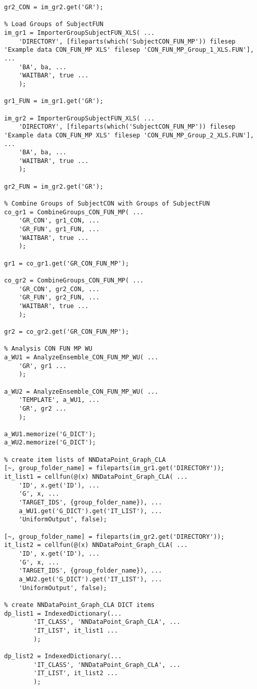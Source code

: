 \documentclass{tufte-handout}
\begin{document}
\begin{lstlisting}
gr2_CON = im_gr2.get('GR');

% Load Groups of SubjectFUN
im_gr1 = ImporterGroupSubjectFUN_XLS( ...
    'DIRECTORY', [fileparts(which('SubjectCON_FUN_MP')) filesep 'Example data CON_FUN_MP XLS' filesep 'CON_FUN_MP_Group_1_XLS.FUN'], ...
    'BA', ba, ...
    'WAITBAR', true ...
    );

gr1_FUN = im_gr1.get('GR');

im_gr2 = ImporterGroupSubjectFUN_XLS( ...
    'DIRECTORY', [fileparts(which('SubjectCON_FUN_MP')) filesep 'Example data CON_FUN_MP XLS' filesep 'CON_FUN_MP_Group_2_XLS.FUN'], ...
    'BA', ba, ...
    'WAITBAR', true ...
    );

gr2_FUN = im_gr2.get('GR');

% Combine Groups of SubjectCON with Groups of SubjectFUN
co_gr1 = CombineGroups_CON_FUN_MP( ...
    'GR_CON', gr1_CON, ...
    'GR_FUN', gr1_FUN, ...
    'WAITBAR', true ...
    );

gr1 = co_gr1.get('GR_CON_FUN_MP');

co_gr2 = CombineGroups_CON_FUN_MP( ...
    'GR_CON', gr2_CON, ...
    'GR_FUN', gr2_FUN, ...
    'WAITBAR', true ...
    );

gr2 = co_gr2.get('GR_CON_FUN_MP');

% Analysis CON FUN MP WU
a_WU1 = AnalyzeEnsemble_CON_FUN_MP_WU( ...
    'GR', gr1 ...
    );

a_WU2 = AnalyzeEnsemble_CON_FUN_MP_WU( ...
    'TEMPLATE', a_WU1, ...
    'GR', gr2 ...
    );

a_WU1.memorize('G_DICT');
a_WU2.memorize('G_DICT');

% create item lists of NNDataPoint_Graph_CLA
[~, group_folder_name] = fileparts(im_gr1.get('DIRECTORY'));
it_list1 = cellfun(@(x) NNDataPoint_Graph_CLA( ...
    'ID', x.get('ID'), ...
    'G', x, ...
    'TARGET_IDS', {group_folder_name}), ...
    a_WU1.get('G_DICT').get('IT_LIST'), ...
    'UniformOutput', false);

[~, group_folder_name] = fileparts(im_gr2.get('DIRECTORY'));
it_list2 = cellfun(@(x) NNDataPoint_Graph_CLA( ...
    'ID', x.get('ID'), ...
    'G', x, ...
    'TARGET_IDS', {group_folder_name}), ...
    a_WU2.get('G_DICT').get('IT_LIST'), ...
    'UniformOutput', false);

% create NNDataPoint_Graph_CLA DICT items
dp_list1 = IndexedDictionary(...
        'IT_CLASS', 'NNDataPoint_Graph_CLA', ...
        'IT_LIST', it_list1 ...
        );

dp_list2 = IndexedDictionary(...
        'IT_CLASS', 'NNDataPoint_Graph_CLA', ...
        'IT_LIST', it_list2 ...
        );


\end{lstlisting}
\end{document}
